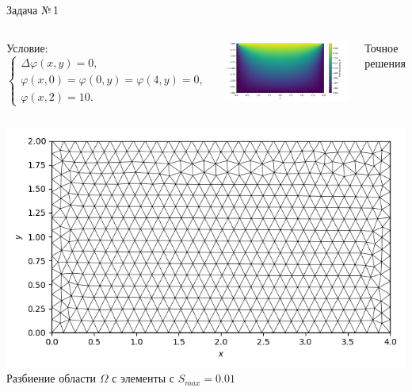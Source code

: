 \documentclass[ignoreonframetext,xcolor=table, unicode, 10pt]{beamer}
\begin{document}
\begin{frame}{Задача №\,1}%
	
	\begin{columns}
		
		Условие:
		\begin{equation*}
			\begin{cases}
				\Delta \varphi (x, y)  = 0, \\
				\varphi (x, 0) = \varphi (0, y) = \varphi (4, y) = 0, \\
				\varphi (x, 2) = 10.
			\end{cases}
		\end{equation*}
		
		\hspace*{-10mm}
		\centering
		\includegraphics[width=1.2\columnwidth]{rect_dirichlet_only_exact_sol.png}
		
		\hspace*{-13mm}Точное решения\vspace*{2mm}
	\end{columns}
	
	\begin{columns}
		\hspace*{-5mm}
		\centering
		\includegraphics[width=1\columnwidth]{rect_dirichlet_only_001_calfem_net.png}\\ 
		Разбиение области $\Omega$ с элементы с $S_{max} = 0.01$
		

\end{columns}
\end{frame}
\end{document}
